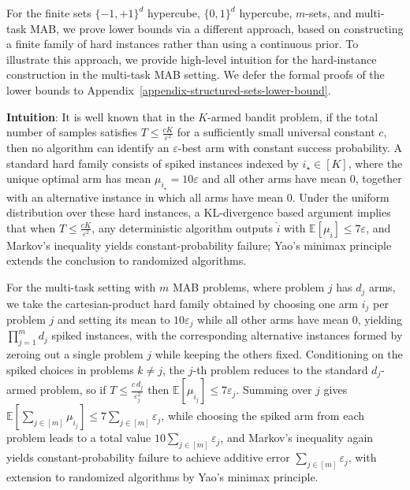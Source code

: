 For the finite sets $\{-1,+1\}^d$ hypercube, $\{0,1\}^d$ hypercube, $m$-sets, and multi-task MAB, we prove lower bounds via a different approach, based on constructing a finite family of hard instances rather than using a continuous prior. To illustrate this approach, we provide high-level intuition for the hard-instance construction in the multi-task MAB setting. We defer the formal proofs of the lower bounds to Appendix~\ref{appendix-structured-sets-lower-bound}.



\textbf{Intuition}: It is well known that in the $K$-armed bandit problem, if the total number of samples satisfies $T \le \frac{cK}{\varepsilon^2}$ for a sufficiently small universal constant $c$, then no algorithm can identify an $\varepsilon$-best arm with constant success probability. A standard hard family consists of spiked instances indexed by $i_\star\in[K]$, where the unique optimal arm has mean $\mu_{i_\star}=10\varepsilon$ and all other arms have mean $0$, together with an alternative instance in which all arms have mean $0$. Under the uniform distribution over these hard instances, a KL-divergence based argument implies that when $T \le \frac{cK}{\varepsilon^2}$, any deterministic algorithm outputs $\widehat{i}$ with $\mathbb{E}[\mu_{\widehat{i}}]\le 7\varepsilon$, and Markov's inequality yields constant-probability failure; Yao's minimax principle extends the conclusion to randomized algorithms.

For the multi-task setting with $m$ MAB problems, where problem $j$ has $d_j$ arms, we take the cartesian-product hard family obtained by choosing one arm $i_j$ per problem $j$ and setting its mean to $10\varepsilon_j$ while all other arms have mean $0$, yielding $\prod_{j=1}^m d_j$ spiked instances, with the corresponding alternative instances formed by zeroing out a single problem $j$ while keeping the others fixed. Conditioning on the spiked choices in problems $k\neq j$, the $j$-th problem reduces to the standard $d_j$-armed problem, so if $T \le \frac{c\,d_j}{\varepsilon_j^2}$ then $\mathbb{E}[\mu_{\widehat{i}_j}] \le 7\varepsilon_j$. Summing over $j$ gives $\mathbb{E}\!\left[\sum_{j\in[m]}\mu_{\widehat{i}_j}\right]\le 7\sum_{j\in[m]}\varepsilon_j$, while choosing the spiked arm from each problem leads to a total value $10\sum_{j\in[m]}\varepsilon_j$, and Markov's inequality again yields constant-probability failure to achieve additive error $\sum_{j\in[m]}\varepsilon_j$, with extension to randomized algorithms by Yao's minimax principle.






